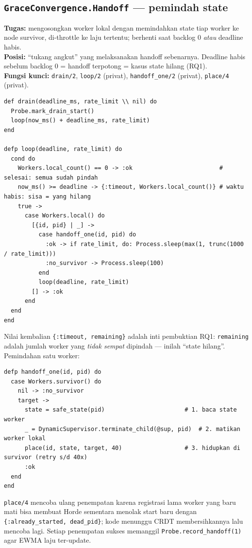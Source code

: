 \documentclass[11pt]{article}
\newcommand{\code}[1]{\texttt{\small #1}}
\begin{document}
\subsection{\texttt{GraceConvergence.Handoff} --- pemindah state}
\textbf{Tugas:} mengosongkan worker lokal dengan memindahkan state tiap worker ke node survivor,
di-throttle ke laju tertentu; berhenti saat backlog 0 \emph{atau} deadline habis. \\
\textbf{Posisi:} ``tukang angkut'' yang melaksanakan handoff sebenarnya. Deadline habis sebelum backlog
0 = handoff terpotong = kasus state hilang (RQ1). \\
\textbf{Fungsi kunci:} \code{drain/2}, \code{loop/2} (privat), \code{handoff\_one/2} (privat),
\code{place/4} (privat).
\begin{lstlisting}[style=ex]
def drain(deadline_ms, rate_limit \\ nil) do
  Probe.mark_drain_start()
  loop(now_ms() + deadline_ms, rate_limit)
end

defp loop(deadline, rate_limit) do
  cond do
    Workers.local_count() == 0 -> :ok                         # selesai: semua sudah pindah
    now_ms() >= deadline -> {:timeout, Workers.local_count()} # waktu habis: sisa = yang hilang
    true ->
      case Workers.local() do
        [{id, pid} | _] ->
          case handoff_one(id, pid) do
            :ok -> if rate_limit, do: Process.sleep(max(1, trunc(1000 / rate_limit)))
            :no_survivor -> Process.sleep(100)
          end
          loop(deadline, rate_limit)
        [] -> :ok
      end
  end
end
\end{lstlisting}
Nilai kembalian \code{\{:timeout, remaining\}} adalah inti pembuktian RQ1: \code{remaining} adalah
jumlah worker yang \emph{tidak sempat} dipindah --- inilah ``state hilang''. Pemindahan satu worker:
\begin{lstlisting}[style=ex]
defp handoff_one(id, pid) do
  case Workers.survivor() do
    nil -> :no_survivor
    target ->
      state = safe_state(pid)                       # 1. baca state worker
      _ = DynamicSupervisor.terminate_child(@sup, pid)  # 2. matikan worker lokal
      place(id, state, target, 40)                  # 3. hidupkan di survivor (retry s/d 40x)
      :ok
  end
end
\end{lstlisting}
\code{place/4} mencoba ulang penempatan karena registrasi lama worker yang baru mati bisa membuat Horde
sementara menolak start baru dengan \code{\{:already\_started, dead\_pid\}}; kode menunggu CRDT
membersihkannya lalu mencoba lagi. Setiap penempatan sukses memanggil \code{Probe.record\_handoff(1)}
agar EWMA laju ter-update.
\end{document}
